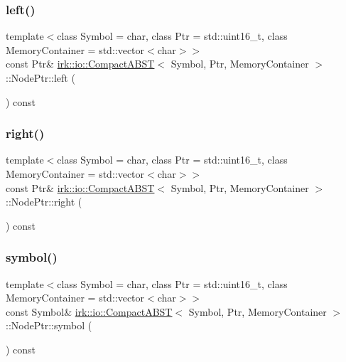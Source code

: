 \subsubsection{\texorpdfstring{left()}{left()}}
{\footnotesize\ttfamily template$<$class Symbol = char, class Ptr = std\+::uint16\+\_\+t, class Memory\+Container = std\+::vector$<$char$>$$>$ \\
const Ptr\& \mbox{\hyperlink{classirk_1_1io_1_1CompactABST}{irk\+::io\+::\+Compact\+A\+B\+ST}}$<$ Symbol, Ptr, Memory\+Container $>$\+::Node\+Ptr\+::left (\begin{DoxyParamCaption}{ }\end{DoxyParamCaption}) const\hspace{0.3cm}{\ttfamily [inline]}}

\mbox{\label{structirk_1_1io_1_1CompactABST_1_1NodePtr_aa0f5ed4f9b4c6b462ad5d39b701aed6c}} 
\subsubsection{\texorpdfstring{right()}{right()}}
{\footnotesize\ttfamily template$<$class Symbol = char, class Ptr = std\+::uint16\+\_\+t, class Memory\+Container = std\+::vector$<$char$>$$>$ \\
const Ptr\& \mbox{\hyperlink{classirk_1_1io_1_1CompactABST}{irk\+::io\+::\+Compact\+A\+B\+ST}}$<$ Symbol, Ptr, Memory\+Container $>$\+::Node\+Ptr\+::right (\begin{DoxyParamCaption}{ }\end{DoxyParamCaption}) const\hspace{0.3cm}{\ttfamily [inline]}}

\mbox{\label{structirk_1_1io_1_1CompactABST_1_1NodePtr_aeb8ba22ab1df782e1ac6c6bfa4d332cb}} 
\subsubsection{\texorpdfstring{symbol()}{symbol()}}
{\footnotesize\ttfamily template$<$class Symbol = char, class Ptr = std\+::uint16\+\_\+t, class Memory\+Container = std\+::vector$<$char$>$$>$ \\
const Symbol\& \mbox{\hyperlink{classirk_1_1io_1_1CompactABST}{irk\+::io\+::\+Compact\+A\+B\+ST}}$<$ Symbol, Ptr, Memory\+Container $>$\+::Node\+Ptr\+::symbol (\begin{DoxyParamCaption}{ }\end{DoxyParamCaption}) const\hspace{0.3cm}{\ttfamily [inline]}}



